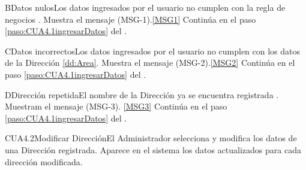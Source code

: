 	\begin{UCtrayectoriaA}{B}{Datos nulos}{Los datos ingresados por el usuario  no cumplen con la regla de negocios .}
			\UCpaso Muestra el mensaje (MSG-1).\ref{MSG1}
			\UCpaso Continúa en el paso \ref{paso:CUA4.1ingresarDatos} del .
	\end{UCtrayectoriaA}
	\begin{UCtrayectoriaA}{C}{Datos incorrectos}{Los datos ingresados por el usuario  no cumplen con los datos de la Dirección \ref{dd:Area}.}
			\UCpaso Muestra el mensaje (MSG-2).\ref{MSG2}
			\UCpaso Continúa en el paso \ref{paso:CUA4.1ingresarDatos} del .
	\end{UCtrayectoriaA}


	\begin{UCtrayectoriaA}{D}{Dirección repetida}{El nombre de la Dirección ya se encuentra registrada .}
		\UCpaso Muestram el mensaje (MSG-3). \ref{MSG3}
		\UCpaso Continúa en el paso \ref{paso:CUA4.1ingresarDatos} del .
	\end{UCtrayectoriaA}

	\begin{UseCase}{CUA4.2}{Modificar Dirección}{El Administrador selecciona y modifica los datos de una Dirección registrada. Aparece en el sistema los datos actualizados para cada dirección modificada.}
			\end{UseCase}

